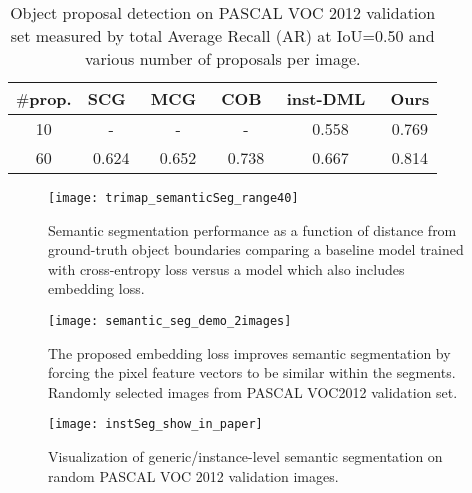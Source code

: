 \documentclass[10pt,twocolumn,letterpaper]{article}
\begin{document}
{
\setlength{\tabcolsep}{0.25em}
\begin{table}%
\centering
{\footnotesize
\begin{tabular}{c | c c c  c |  c  }
\hline
 $\#$prop. & SCG~\cite{pont2017multiscale}
                     & MCG~\cite{pont2017multiscale}
                     & COB~\cite{maninis2017convolutional}
                     & inst-DML~\cite{fathi2017semantic}
                     & Ours      \\
\hline
10               & -            & -         & -     &  0.558     & 0.769 \\
60               & 0.624        & 0.652     & 0.738 &  0.667     & 0.814 \\
\hline
\end{tabular}
}
\vspace{-3mm}
\caption{Object proposal detection on PASCAL VOC 2012 validation set measured
by total Average Recall (AR) at IoU=0.50 and various number of proposals per image.}
\vspace{-2mm}
\label{tab:objProposalDet}
\end{table}
}\begin{figure}[t]
\centering
   \texttt{[image: trimap\_semanticSeg\_range40]} %
   \vspace{-2mm}
   \caption{Semantic segmentation performance as a function of distance from ground-truth
   object boundaries comparing a baseline model trained with cross-entropy loss versus a
   model which also includes embedding loss.
   }
\label{fig:trimap_semanticSeg}
\vspace{-1mm}
\end{figure}\begin{figure}[t]
\centering
   \texttt{[image: semantic\_seg\_demo\_2images]} %
   \vspace{-5mm}
   \caption{The proposed embedding loss improves semantic segmentation by
   forcing the pixel feature vectors to be similar within the segments.
   Randomly selected images from PASCAL VOC2012 validation set.}
\label{fig:semantic_seg_demo}
\vspace{-3mm}
\end{figure}\begin{figure*}[ht]
\centering
   \texttt{[image: instSeg\_show\_in\_paper]}
   \vspace{-3mm}
   \caption{Visualization of generic/instance-level semantic segmentation on
   random PASCAL VOC 2012 validation images.
}
\end{figure*}
\end{document}
